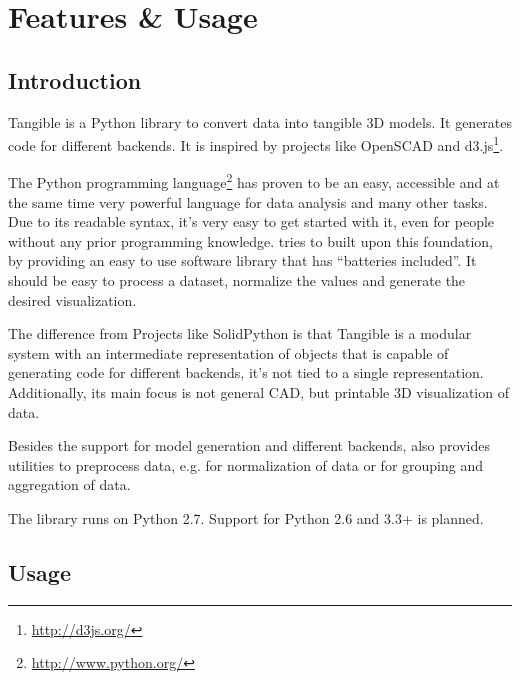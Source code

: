
\chapter{Features {\&} Usage}

\label{ch:features}


\section{Introduction}\label{sec:features:introduction}

Tangible is a Python library to convert data into tangible 3D models. It
generates code for different backends. It is inspired by projects like OpenSCAD
and d3.js\footnote{\url{http://d3js.org/}}.

The Python programming language\footnote{\url{http://www.python.org/}} has
proven to be an easy, accessible and at the same time very powerful language for
data analysis and many other tasks. Due to its readable syntax, it's very easy
to get started with it, even for people without any prior programming knowledge.
\tangible{} tries to built upon this foundation, by providing an easy to use
software library that has ``batteries included''. It should be easy to process a
dataset, normalize the values and generate the desired visualization.

The difference from Projects like SolidPython is that Tangible is a modular
system with an intermediate representation of objects that is capable of
generating code for different backends, it's not tied to a single
representation. Additionally, its main focus is not general CAD, but printable
3D visualization of data.

Besides the support for model generation and different backends, \tangible{}
also provides utilities to preprocess data, e.g. for normalization of data or
for grouping and aggregation of data.

The library runs on Python 2.7. Support for Python 2.6 and 3.3+ is planned.


\section{Usage}\label{sec:features:usage}


